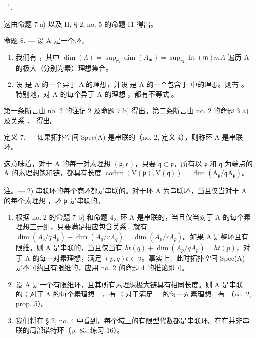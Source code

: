\(^{-1}\).

这由命题 7 a) 以及 II, § 2, no. 5 的命题 11 得出。

命题 8. --- 设 A 是一个环。

\begin{enumerate}
\def\labelenumi{\alph{enumi})}
\item
我们有  ，其中 \(\dim(A) = \sup_{\mathfrak{m}} \dim(A_{\mathfrak{m}}) = \sup_{\mathfrak{m}} \operatorname{ht}(\mathfrak{m})\)\(m\)\(A\) 遍历 A 的极大（分别为素）理想集合。
\item
设  是 A 的一个异于 A 的理想，并设  是 A 的一个包含于  中的理想。则有  。特别地，对 A 的每个异于 A 的理想  ，都有不等式 。
\end{enumerate}

第一条断言由 no. 2 的注记 2 及命题 7 b) 得出。第二条断言由 no. 2 的命题 3 a) 及关系  、  得出。

定义 7. --- 如果拓扑空间 Spec(A) 是串联的（no. 2, 定义 4），则称环 A 是串联环。

这意味着，对于 A 的每一对素理想 \((\mathfrak{p}, \mathfrak{q})\)，只要 \(\mathfrak{q} \subset \mathfrak{p}\)，所有以 \(\mathfrak{p}\) 和 \(\mathfrak{q}\) 为端点的 A 的素理想饱和链，都具有长度 \(\operatorname{codim}(\mathrm{V}(\mathfrak{p}), \mathrm{V}(\mathfrak{q})) = \dim(\mathrm{A}_{\mathfrak{p}} / \mathfrak{q}\mathrm{A}_{\mathfrak{p}})\)。

注。--- 2) 串联环的每个商环都是串联的。对于环 A 为串联环，当且仅当对于 A 的每个素理想  ，环 \(\mathfrak{p}\) 是串联的。

\begin{enumerate}
\def\labelenumi{\arabic{enumi})}
\setcounter{enumi}{2}
\item
  根据 no. 2 的命题 7 b) 和命题 4，环 A 是串联的，当且仅当对于 A 的每个素理想三元组，只要满足相应包含关系，就有 \(\dim(A_{p}/qA_{p}) + \dim(A_{q}/rA_{q}) = \dim(A_{p}/rA_{p})\)。如果 A 是整环且有限维，则 A 是串联的，当且仅当有 \(ht(q) + \dim(A_{p}/qA_{p}) = ht(p)\)，对于 A 的每一对素理想，满足 \((p, q)\)\(\mathfrak{q} \subset \mathfrak{p}\)。事实上，此时拓扑空间 Spec(A) 是不可约且有限维的，应用 no. 2 的命题 4 的推论即可。
\item
  设 A 是一个有限维环，且其所有素理想极大链具有相同长度。则 A 是串联的；对于 A 的每个素理想 \_，有 ；对于满足 \_ 的每一对素理想，有  （no. 2, prop. 5）。
\item
我们将在 § 2, no. 4 中看到，每个域上的有限型代数都是串联环。存在并非串联的局部诺特环（p. 83, 练习 16）。
\end{enumerate}

